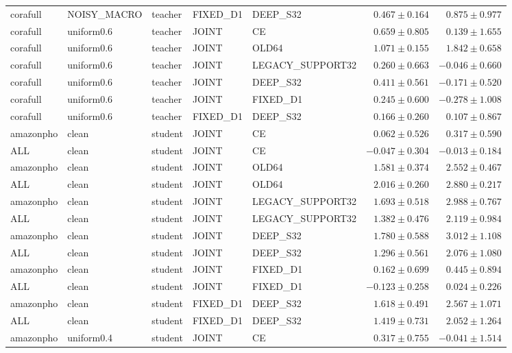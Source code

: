 \begin{longtable}{lllllrr}
corafull & NOISY\_MACRO & teacher & FIXED\_D1 & DEEP\_S32 & $0.467 \pm 0.164$ & $0.875 \pm 0.977$ \\
corafull & uniform0.6 & teacher & JOINT & CE & $0.659 \pm 0.805$ & $0.139 \pm 1.655$ \\
corafull & uniform0.6 & teacher & JOINT & OLD64 & $1.071 \pm 0.155$ & $1.842 \pm 0.658$ \\
corafull & uniform0.6 & teacher & JOINT & LEGACY\_SUPPORT32 & $0.260 \pm 0.663$ & $-0.046 \pm 0.660$ \\
corafull & uniform0.6 & teacher & JOINT & DEEP\_S32 & $0.411 \pm 0.561$ & $-0.171 \pm 0.520$ \\
corafull & uniform0.6 & teacher & JOINT & FIXED\_D1 & $0.245 \pm 0.600$ & $-0.278 \pm 1.008$ \\
corafull & uniform0.6 & teacher & FIXED\_D1 & DEEP\_S32 & $0.166 \pm 0.260$ & $0.107 \pm 0.867$ \\
amazonpho & clean & student & JOINT & CE & $0.062 \pm 0.526$ & $0.317 \pm 0.590$ \\
ALL & clean & student & JOINT & CE & $-0.047 \pm 0.304$ & $-0.013 \pm 0.184$ \\
amazonpho & clean & student & JOINT & OLD64 & $1.581 \pm 0.374$ & $2.552 \pm 0.467$ \\
ALL & clean & student & JOINT & OLD64 & $2.016 \pm 0.260$ & $2.880 \pm 0.217$ \\
amazonpho & clean & student & JOINT & LEGACY\_SUPPORT32 & $1.693 \pm 0.518$ & $2.988 \pm 0.767$ \\
ALL & clean & student & JOINT & LEGACY\_SUPPORT32 & $1.382 \pm 0.476$ & $2.119 \pm 0.984$ \\
amazonpho & clean & student & JOINT & DEEP\_S32 & $1.780 \pm 0.588$ & $3.012 \pm 1.108$ \\
ALL & clean & student & JOINT & DEEP\_S32 & $1.296 \pm 0.561$ & $2.076 \pm 1.080$ \\
amazonpho & clean & student & JOINT & FIXED\_D1 & $0.162 \pm 0.699$ & $0.445 \pm 0.894$ \\
ALL & clean & student & JOINT & FIXED\_D1 & $-0.123 \pm 0.258$ & $0.024 \pm 0.226$ \\
amazonpho & clean & student & FIXED\_D1 & DEEP\_S32 & $1.618 \pm 0.491$ & $2.567 \pm 1.071$ \\
ALL & clean & student & FIXED\_D1 & DEEP\_S32 & $1.419 \pm 0.731$ & $2.052 \pm 1.264$ \\
amazonpho & uniform0.4 & student & JOINT & CE & $0.317 \pm 0.755$ & $-0.041 \pm 1.514$ \\

\end{longtable}
